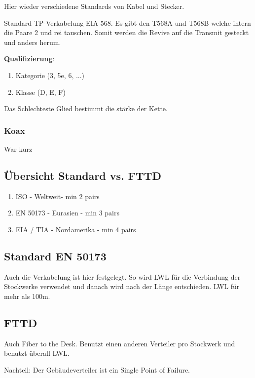 \documentclass[a4paper]{article}
\begin{document}
Hier wieder verschiedene Standards von Kabel und Stecker.

Standard TP-Verkabelung EIA 568. Es gibt den T568A und T568B welche intern die Paare 2 und rei tauschen. Somit werden die Revive auf die Transmit gesteckt und anders herum.

\textbf{Qualifizierung}:

\begin{enumerate}
    \item Kategorie (3, 5e, 6, ...)
    \item Klasse (D, E, F)
\end{enumerate}

Das Schlechteste Glied bestimmt die stärke der Kette.

\subsubsection{Koax}

War kurz

\subsection{Übersicht Standard vs. FTTD}

\begin{enumerate}
    \item ISO - Weltweit- min 2 pairs
    \item EN 50173 - Eurasien - min 3 pairs
    \item EIA / TIA - Nordamerika - min 4 pairs
\end{enumerate}

\subsection{Standard EN 50173}

Auch die Verkabelung ist hier festgelegt. So wird LWL für die Verbindung der Stockwerke verwendet und danach wird nach der Länge entschieden. LWL für mehr als 100m.

\subsection{FTTD}

Auch Fiber to the Desk. Benutzt einen anderen Verteiler pro Stockwerk und benutzt überall LWL. 

Nachteil: Der Gebäudeverteiler ist ein Single Point of Failure.

\end{document}
